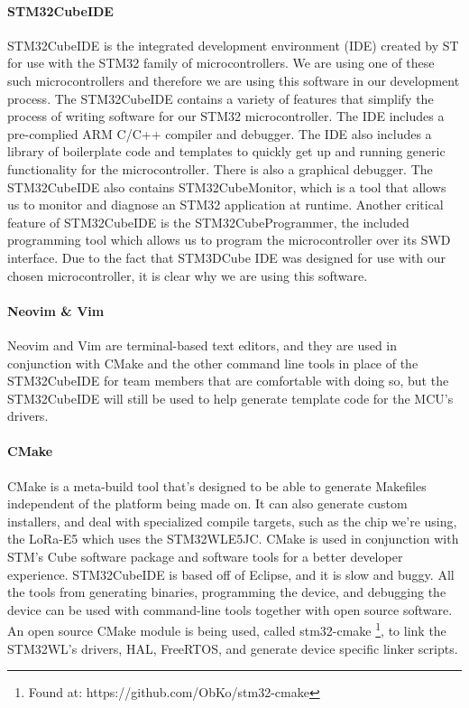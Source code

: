 \paragraph{STM32CubeIDE}
STM32CubeIDE is the integrated development environment (IDE) created by ST for use with the STM32 family of microcontrollers. We are using one of these such microcontrollers and therefore we are using this software in our development process. The STM32CubeIDE contains a variety of features that simplify the process of writing software for our STM32 microcontroller. The IDE includes a pre-complied ARM C/C++ compiler and debugger. The IDE also includes a library of boilerplate code and templates to quickly get up and running generic functionality for the microcontroller. There is also a graphical debugger. The STM32CubeIDE also contains STM32CubeMonitor, which is a tool that allows us to monitor and diagnose an STM32 application at runtime. Another critical feature of STM32CubeIDE is the STM32CubeProgrammer, the included programming tool which allows us to program the microcontroller over its SWD interface. Due to the fact that STM3DCube IDE was designed for use with our chosen microcontroller, it is clear why we are using this software.

\paragraph{Neovim \& Vim}
Neovim and Vim are terminal-based text editors, and they are used in conjunction with CMake and the
other command line tools in place of the STM32CubeIDE for team members that are comfortable with
doing so, but the STM32CubeIDE will still be used to help generate template code for the MCU's
drivers.

\paragraph{CMake}
CMake is a meta-build tool that's designed to be able to generate Makefiles independent of the
platform being made on. It can also generate custom installers, and deal with specialized compile
targets, such as the chip we're using, the LoRa-E5 which uses the STM32WLE5JC. CMake is used in
conjunction with STM's Cube software package and software tools for a better developer experience.
STM32CubeIDE is based off of Eclipse, and it is slow and buggy. All the tools from generating
binaries, programming the device, and debugging the device can be used with command-line tools
together with open source software. An open source CMake module is being used, called stm32-cmake
\footnote{Found at: https://github.com/ObKo/stm32-cmake}, to link the STM32WL's drivers, HAL,
FreeRTOS, and generate device specific linker scripts.

